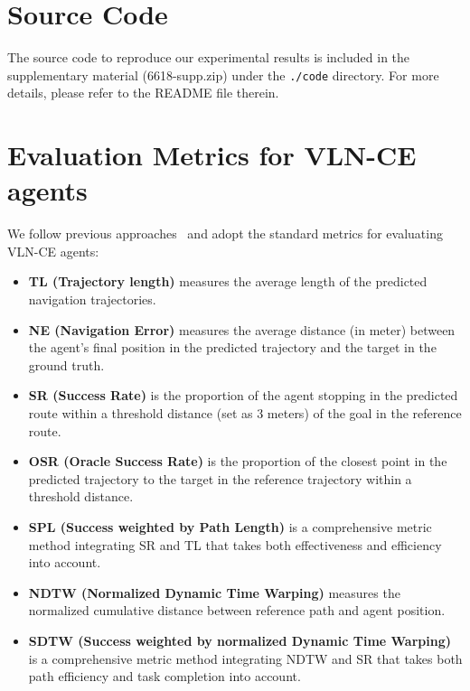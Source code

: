\documentclass{article}
\theoremstyle{plain}
\theoremstyle{definition}
\theoremstyle{remark}
\begin{document}
\section{Source Code}\label{sec:code}
The source code to reproduce our experimental results is included in the supplementary material (6618-supp.zip) under the \texttt{./code} directory. For more details, please refer to the README file therein.

\section{Evaluation Metrics for VLN-CE agents}
\label{sec:metrics}
We follow previous approaches~\cite{anderson2018vision, anderson2018evaluation,ilharco2019general} and adopt the standard metrics for evaluating VLN-CE agents:
\begin{itemize}[left=1em]
	\item \textbf{TL (Trajectory length)} measures the average length of the predicted navigation trajectories.
	\item \textbf{NE (Navigation Error)} measures the average distance (in meter) between the agent's final position in the predicted trajectory and the target in the ground truth.
	\item \textbf{SR (Success Rate)} is the proportion of the agent stopping
	in the predicted route within a threshold distance (set as 3 meters) of the goal
	in the reference route.
	\item \textbf{OSR (Oracle Success Rate)} is the proportion of the closest point in the predicted trajectory to the target in the reference trajectory within a threshold distance. 
	\item \textbf{SPL (Success weighted by Path Length)} is a comprehensive metric method integrating SR and TL that takes both effectiveness and efficiency into account.
	\item \textbf{NDTW (Normalized Dynamic Time Warping)} measures the normalized cumulative distance between reference path and agent position.
	\item \textbf{SDTW (Success weighted by normalized Dynamic Time Warping)} is a comprehensive metric method integrating NDTW and SR that takes both path efficiency and task completion into account.
\end{itemize}
\end{document}
